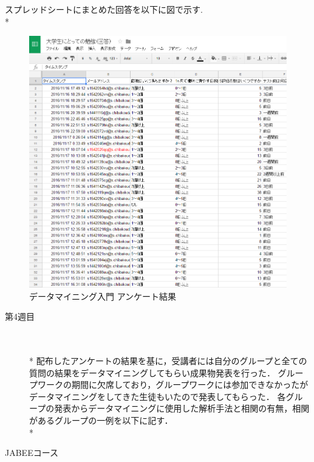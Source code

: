 スプレッドシートにまとめた回答を以下に図で示す.  \vspace{0.1in} \\*

\begin{figure}[h]
\centering
\includegraphics[width=14cm]{sheet.PNG}
\caption{データマイニング入門 アンケート結果}\label{サンプル図}
\end{figure}

\newpage

\begin{description}
 \item[第4週目]\mbox{}\\  \vspace{0.1in} \\*
	配布したアンケートの結果を基に，受講者には自分のグループと全ての質問の結果をデータマイニングしてもらい成果物発表を行った．
グループワークの期間に欠席しており，グループワークには参加できなかったがデータマイニングをしてきた生徒もいたので発表してもらった．
各グループの発表からデータマイニングに使用した解析手法と相関の有無，相関があるグループの一例を以下に記す．  \vspace{0.1in} \\*
\end{description}

\begin{description}
 \item[JABEEコース]\mbox{}\\
\end{description}

